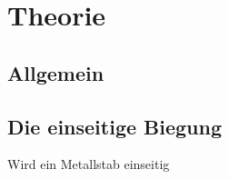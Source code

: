 \section{Theorie}
\label{sec:Theorie}

\subsection{Allgemein}

\subsection{Die einseitige Biegung}
Wird ein Metallstab einseitig 

\cite{sample}
